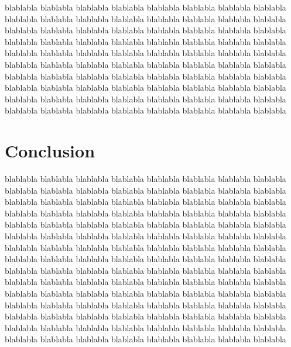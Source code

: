 \documentclass[runningheads]{llncs}
\begin{document}
blablabla
blablabla
blablabla
blablabla
blablabla
blablabla
blablabla
blablabla
blablabla
blablabla
blablabla
blablabla
blablabla
blablabla
blablabla
blablabla
blablabla
blablabla
blablabla
blablabla
blablabla
blablabla
blablabla
blablabla
blablabla
blablabla
blablabla
blablabla
blablabla
blablabla
blablabla
blablabla
blablabla
blablabla
blablabla
blablabla
blablabla
blablabla
blablabla
blablabla
blablabla
blablabla
blablabla
blablabla
blablabla
blablabla
blablabla
blablabla
blablabla
blablabla
blablabla
blablabla
blablabla
blablabla
blablabla
blablabla
blablabla
blablabla
blablabla
blablabla
blablabla
blablabla
blablabla
blablabla
blablabla
blablabla
blablabla
blablabla
blablabla
blablabla
blablabla
blablabla
blablabla
blablabla
blablabla
blablabla
blablabla
blablabla
blablabla
blablabla

\section{Conclusion}
blablabla
blablabla
blablabla
blablabla
blablabla
blablabla
blablabla
blablabla
blablabla
blablabla
blablabla
blablabla
blablabla
blablabla
blablabla
blablabla
blablabla
blablabla
blablabla
blablabla
blablabla
blablabla
blablabla
blablabla
blablabla
blablabla
blablabla
blablabla
blablabla
blablabla
blablabla
blablabla
blablabla
blablabla
blablabla
blablabla
blablabla
blablabla
blablabla
blablabla
blablabla
blablabla
blablabla
blablabla
blablabla
blablabla
blablabla
blablabla
blablabla
blablabla
blablabla
blablabla
blablabla
blablabla
blablabla
blablabla
blablabla
blablabla
blablabla
blablabla
blablabla
blablabla
blablabla
blablabla
blablabla
blablabla
blablabla
blablabla
blablabla
blablabla
blablabla
blablabla
blablabla
blablabla
blablabla
blablabla
blablabla
blablabla
blablabla
blablabla
blablabla
blablabla
blablabla
blablabla
blablabla
blablabla
blablabla
blablabla
blablabla
blablabla
blablabla
blablabla
blablabla
blablabla
blablabla
blablabla
blablabla
blablabla
blablabla
blablabla
blablabla
blablabla
blablabla
blablabla
blablabla
blablabla
blablabla
blablabla
blablabla
blablabla
blablabla
blablabla
blablabla
blablabla
blablabla
blablabla
blablabla
blablabla
blablabla
blablabla


\end{document}
